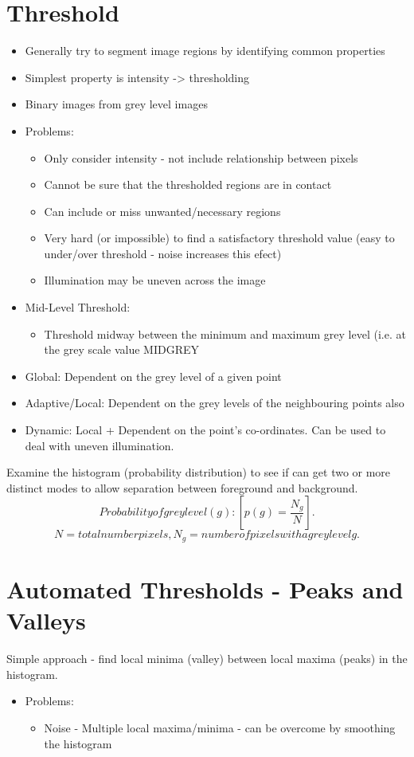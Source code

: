 \documentclass[a4paper]{article}
\begin{document}
	\section{Threshold}
	\begin{itemize}
		\item Generally try to segment image regions by identifying common properties
		\item Simplest property is intensity -> thresholding
		\item Binary images from grey level images
		\item Problems:
		\begin{itemize}
			\item Only consider intensity - not include relationship between pixels
			\item Cannot be sure that the thresholded regions are in contact
			\item Can include or miss unwanted/necessary regions
			\item Very hard (or impossible) to find a satisfactory threshold value (easy to under/over threshold - noise increases this efect)
			\item Illumination may be uneven across the image
		\end{itemize}
		\item Mid-Level Threshold:
		\begin{itemize}
			\item Threshold midway between the minimum and maximum grey level (i.e. at the grey scale value MIDGREY
		\end{itemize}
		\item Global: Dependent on the grey level of a given point
		\item Adaptive/Local: Dependent on the grey levels of the neighbouring points also
		\item Dynamic: Local + Dependent on the point's co-ordinates. Can be used to deal with uneven illumination.
	\end{itemize}
	Examine the histogram (probability distribution) to see if can get two or more distinct modes to allow separation between foreground and background.
	\[Probability of grey level(g): [p(g) = \frac{N_g}{N}].\]
	\[N = total number pixels, N_g = number of pixels with a grey level g.\]
	\section{Automated Thresholds - Peaks and Valleys}
	Simple approach - find local minima (valley) between local maxima (peaks) in the histogram.
	\begin{itemize}
		\item Problems:
		\begin{itemize}
			\item Noise - Multiple local maxima/minima - can be overcome by smoothing the histogram
		\end{itemize}
	\end{itemize}
\end{document}
